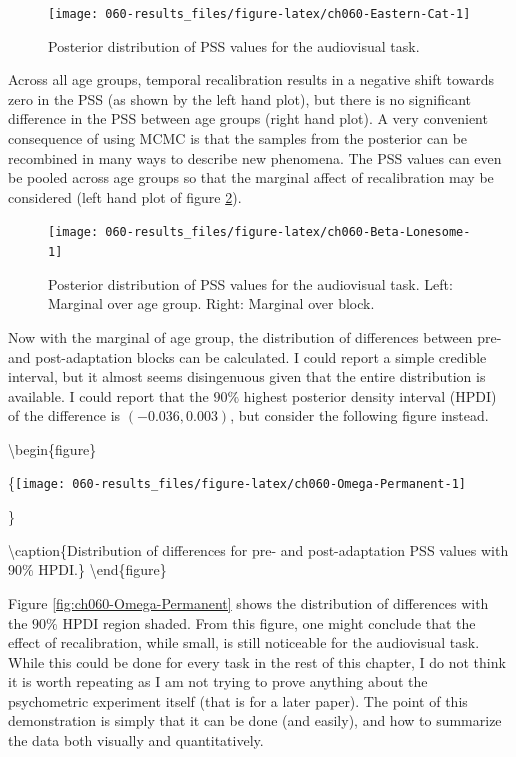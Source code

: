\documentclass[11pt, oneside, openany]{scrbook}
\begin{document}
\begin{figure}

{\centering \texttt{[image: 060-results\_files/figure-latex/ch060-Eastern-Cat-1]} 

}

\caption{Posterior distribution of PSS values for the audiovisual task.}\label{fig:ch060-Eastern-Cat}
\end{figure}

Across all age groups, temporal recalibration results in a negative shift towards zero in the PSS (as shown by the left hand plot), but there is no significant difference in the PSS between age groups (right hand plot). A very convenient consequence of using MCMC is that the samples from the posterior can be recombined in many ways to describe new phenomena. The PSS values can even be pooled across age groups so that the marginal affect of recalibration may be considered (left hand plot of figure \ref{fig:ch060-Beta-Lonesome}).

\begin{figure}

{\centering \texttt{[image: 060-results\_files/figure-latex/ch060-Beta-Lonesome-1]} 

}

\caption{Posterior distribution of PSS values for the audiovisual task. Left: Marginal over age group. Right: Marginal over block.}\label{fig:ch060-Beta-Lonesome}
\end{figure}

Now with the marginal of age group, the distribution of differences between pre- and post-adaptation blocks can be calculated. I could report a simple credible interval, but it almost seems disingenuous given that the entire distribution is available. I could report that the \(90\%\) highest posterior density interval (HPDI) of the difference is \((-0.036, 0.003)\), but consider the following figure instead.

\textbackslash begin\{figure\}

\{\centering \texttt{[image: 060-results\_files/figure-latex/ch060-Omega-Permanent-1]}

\}

\textbackslash caption\{Distribution of differences for pre- and post-adaptation PSS values with 90\% HPDI.\}\label{fig:ch060-Omega-Permanent}
\textbackslash end\{figure\}

Figure \ref{fig:ch060-Omega-Permanent} shows the distribution of differences with the \(90\%\) HPDI region shaded. From this figure, one might conclude that the effect of recalibration, while small, is still noticeable for the audiovisual task. While this could be done for every task in the rest of this chapter, I do not think it is worth repeating as I am not trying to prove anything about the psychometric experiment itself (that is for a later paper). The point of this demonstration is simply that it can be done (and easily), and how to summarize the data both visually and quantitatively.
\end{document}
